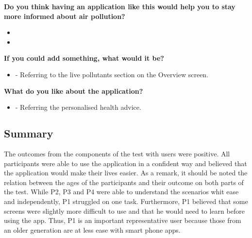 \bigskip
\textbf{Do you think having an application like this would help you to stay more informed about air pollution?}
\bigskip

\begin{itemize}
	\item {}
    \item {}
\end{itemize}

\bigskip
\textbf{If you could add something, what would it be?}
\bigskip

\begin{itemize}
	\item {} - Referring to the live pollutants section on the Overview screen. 
\end{itemize}

\bigskip
\textbf{What do you like about the application?}
\bigskip

\begin{itemize}
	\item {} - Referring the personalised health advice.
\end{itemize}

\subsection{Summary}
The outcomes from the components of the test with users were positive. All participants were able to use the application in a confident way and believed that the application would make their lives easier. As a remark, it should be noted the relation between the ages of the participants and their outcome on both parts of the test. While P2, P3 and P4 were able to understand the scenarios whit ease and independently, P1 struggled on one task. Furthermore, P1 believed that some screens were slightly more difficult to use and that he would need to learn before using the app. Thus, P1 is an important representative user because those from an older generation are at less ease with smart phone apps.